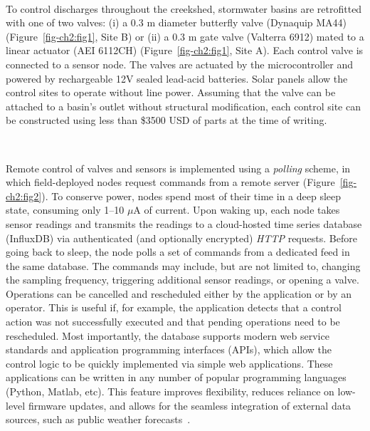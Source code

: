 \

To control discharges throughout the creekshed, stormwater basins are retrofitted with one of two valves: (i) a 0.3 m diameter butterfly valve (Dynaquip MA44) (Figure~\ref{fig-ch2:fig1}, Site B) or (ii) a 0.3 m gate valve (Valterra 6912) mated to a linear actuator (AEI 6112CH) (Figure~\ref{fig-ch2:fig1}, Site A). Each control valve is connected to a sensor node. The valves are actuated by the microcontroller and powered by rechargeable 12V sealed lead-acid batteries. Solar panels allow the control sites to operate without line power. Assuming that the valve can be attached to a basin's outlet without structural modification, each control site can be constructed using less than \$3500 USD of parts at the time of writing.

\

Remote control of valves and sensors is implemented using a \textit{polling} scheme, in which field-deployed nodes request commands from a remote server (Figure~\ref{fig-ch2:fig2}). To conserve power, nodes spend most of their time in a deep sleep state, consuming only 1--10 $\mu$A of current. Upon waking up, each node takes sensor readings and transmits the readings to a cloud-hosted time series database (InfluxDB) via authenticated (and optionally encrypted) \textit{HTTP} requests. Before going back to sleep, the node polls a set of commands from a dedicated feed in the same database. The commands may include, but are not limited to, changing the sampling frequency, triggering additional sensor readings, or opening a valve.
Operations can be cancelled and rescheduled either by the application or by an operator. This is useful if, for example, the application detects that a control action was not successfully executed and that pending operations need to be rescheduled. Most importantly, the database supports modern web service standards and application programming interfaces (APIs), which allow the control logic to be quickly implemented via simple web applications. These applications can be written in any number of popular programming languages (Python, Matlab, etc). This feature improves flexibility, reduces reliance on low-level firmware updates, and allows for the seamless integration of external data sources, such as public weather forecasts~\cite{Wong_2016b, Bartos_2018}.

